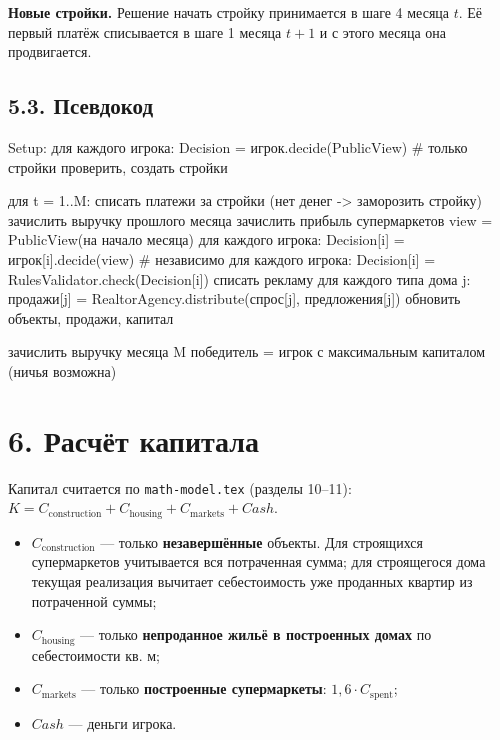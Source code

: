 \documentclass[
]{article}
\newenvironment{Shaded}{\begin{snugshade}}{\end{snugshade}}
\newcommand{\NormalTok}[1]{#1}
\providecommand{\tightlist}{%
  \setlength{\itemsep}{0pt}\setlength{\parskip}{0pt}}
\begin{document}
\textbf{Новые стройки.} Решение начать стройку принимается в шаге 4
месяца \(t\). Её первый платёж списывается в шаге 1 месяца \(t+1\) и с
этого месяца она продвигается.

\subsection{5.3.
Псевдокод}\label{ux43fux441ux435ux432ux434ux43eux43aux43eux434}

\begin{Shaded}
\begin{Highlighting}[]
\NormalTok{Setup:}
\NormalTok{    для каждого игрока: Decision = игрок.decide(PublicView)   \# только стройки}
\NormalTok{    проверить, создать стройки}

\NormalTok{для t = 1..M:}
\NormalTok{    списать платежи за стройки (нет денег {-}\textgreater{} заморозить стройку)}
\NormalTok{    зачислить выручку прошлого месяца}
\NormalTok{    зачислить прибыль супермаркетов}
\NormalTok{    view = PublicView(на начало месяца)}
\NormalTok{    для каждого игрока: Decision[i] = игрок[i].decide(view)     \# независимо}
\NormalTok{    для каждого игрока: Decision[i] = RulesValidator.check(Decision[i])}
\NormalTok{    списать рекламу}
\NormalTok{    для каждого типа дома j:}
\NormalTok{        продажи[j] = RealtorAgency.distribute(спрос[j], предложения[j])}
\NormalTok{    обновить объекты, продажи, капитал}

\NormalTok{зачислить выручку месяца M}
\NormalTok{победитель = игрок с максимальным капиталом (ничья возможна)}
\end{Highlighting}
\end{Shaded}

\section{6. Расчёт
капитала}\label{ux440ux430ux441ux447ux451ux442-ux43aux430ux43fux438ux442ux430ux43bux430}

Капитал считается по \texttt{math-model.tex} (разделы 10--11):
\(K = C_{\text{construction}} + C_{\text{housing}} + C_{\text{markets}} + Cash\).

\begin{itemize}
\tightlist
\item
  \(C_{\text{construction}}\) --- только \textbf{незавершённые} объекты.
  Для строящихся супермаркетов учитывается вся потраченная сумма; для
  строящегося дома текущая реализация вычитает себестоимость уже проданных
  квартир из потраченной суммы;
\item
  \(C_{\text{housing}}\) --- только \textbf{непроданное жильё в
  построенных домах} по себестоимости кв. м;
\item
  \(C_{\text{markets}}\) --- только \textbf{построенные супермаркеты}:
  \(1{,}6 \cdot C_{\text{spent}}\);
\item
  \(Cash\) --- деньги игрока.
\end{itemize}
\end{document}
